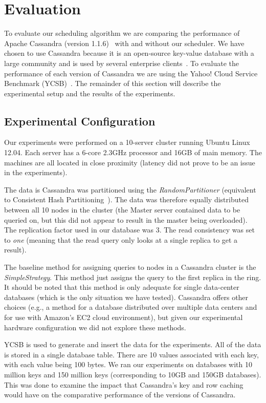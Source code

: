 \section{Evaluation}
To evaluate our scheduling algorithm we are comparing the performance of Apache Cassandra (version 1.1.6)~\cite{Lakshman:2010:CDS:1773912.1773922} with and without our scheduler. We have chosen to use Cassandra because it is an open-source key-value database with a large community and is used by several enterprise clients~\cite{DataStaxCassandra}. To evaluate the performance of each version of Cassandra we are using the Yahoo! Cloud Service Benchmark (YCSB)~\cite{Cooper:2010:BCS:1807128.1807152}. The remainder of this section will describe the experimental setup and the results of the experiments.

\subsection{Experimental Configuration}
Our experiments were performed on a 10-server cluster running Ubuntu Linux 12.04. Each server has a 6-core 2.3GHz processor and 16GB of main memory. The machines are all located in close proximity (latency did not prove to be an issue in the experiments).

The data is Cassandra was partitioned using the \textit{RandomPartitioner} (equivalent to Consistent Hash Partitioning~\cite{consistentHashPartitioning}). The data was therefore equally distributed between all 10 nodes in the cluster (the Master server contained data to be queried on, but this did not appear to result in the master being overloaded). The replication factor used in our database was 3. The read consistency was set to \textit{one} (meaning that the read query only looks at a single replica to get a result).

The baseline method for assigning queries to nodes in a Cassandra cluster is the \textit{SimpleStrategy}. This method just assigns the query to the first replica in the ring. It should be noted that this method is only adequate for single data-center databases (which is the only situation we have tested). Cassandra offers other choices (e.g., a method for a database distributed over multiple data centers and for use with Amazon’s EC2 cloud environment), but given our experimental hardware configuration we did not explore these methods.

YCSB is used to generate and insert the data for the experiments. All of the data is stored in a single database table. There are 10 values associated with each key, with each value being 100 bytes. We ran our experiments on databases with 10 million keys and 150 million keys (corresponding to 10GB and 150GB databases). This was done to examine the impact that Cassandra’s key and row caching would have on the comparative performance of the versions of Cassandra.


